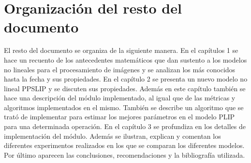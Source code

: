 \section*{Organizaci\'on del resto del documento}

El resto del documento se organiza de la siguiente manera. En el cap\'itulos 1 se hace un recuento de los antecedentes matem\'aticos que dan sustento a los modelos no lineales para el procesamiento de im\'agenes y se analizan los m\'as conocidos hasta la fecha y sus propiedades. En el cap\'itulo 2 se presenta un nuevo modelo no lineal PPSLIP y se discuten sus propiedades. Adem\'as en este cap\'itulo tambi\'en se hace una descripci\'on del m\'odulo implementado, al igual que de las m\'etricas y algoritmos implementados en el mismo. Tambi\'en se describe un algoritmo que se trat\'o de implementar para estimar los mejores par\'ametros en el modelo PLIP para una determinada operaci\'on. En el cap\'itulo 3 se profundiza en los detalles de implementaci\'on del m\'odulo. Adem\'as se ilustran, explican y comentan los diferentes experimentos realizados en los que se comparan los diferentes modelos. Por \'ultimo aparecen las conclusiones, recomendaciones y la bibliograf\'ia utilizada.